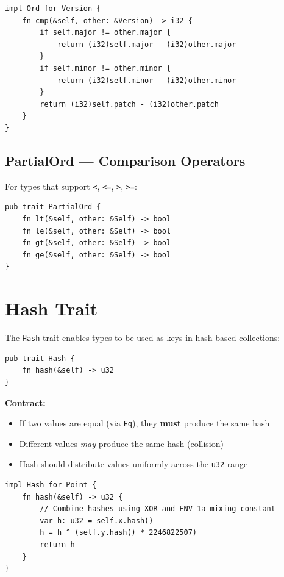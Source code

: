 \begin{lstlisting}
impl Ord for Version {
    fn cmp(&self, other: &Version) -> i32 {
        if self.major != other.major {
            return (i32)self.major - (i32)other.major
        }
        if self.minor != other.minor {
            return (i32)self.minor - (i32)other.minor
        }
        return (i32)self.patch - (i32)other.patch
    }
}
\end{lstlisting}

\subsection{PartialOrd --- Comparison Operators}

For types that support \texttt{<}, \texttt{<=}, \texttt{>}, \texttt{>=}:

\begin{lstlisting}
pub trait PartialOrd {
    fn lt(&self, other: &Self) -> bool
    fn le(&self, other: &Self) -> bool
    fn gt(&self, other: &Self) -> bool
    fn ge(&self, other: &Self) -> bool
}
\end{lstlisting}

\section{Hash Trait}
\label{sec:hash-trait}

The \texttt{Hash} trait enables types to be used as keys in hash-based collections:

\begin{lstlisting}
pub trait Hash {
    fn hash(&self) -> u32
}
\end{lstlisting}

\textbf{Contract:}
\begin{itemize}
    \item If two values are equal (via \texttt{Eq}), they \textbf{must} produce the same hash
    \item Different values \textit{may} produce the same hash (collision)
    \item Hash should distribute values uniformly across the \texttt{u32} range
\end{itemize}

\begin{lstlisting}
impl Hash for Point {
    fn hash(&self) -> u32 {
        // Combine hashes using XOR and FNV-1a mixing constant
        var h: u32 = self.x.hash()
        h = h ^ (self.y.hash() * 2246822507)
        return h
    }
}
\end{lstlisting}

